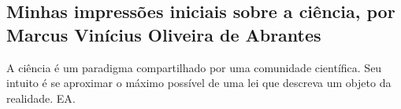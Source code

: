 \subsection{Minhas impressões iniciais sobre a ciência, por Marcus Vinícius Oliveira de Abrantes}

A ciência é um \gls{paradigma} compartilhado por uma comunidade científica. Seu intuito é se aproximar o máximo possível de uma lei que descreva um objeto da realidade.
\citep{baldwin_three-fold_1994}
\gls{EA}.